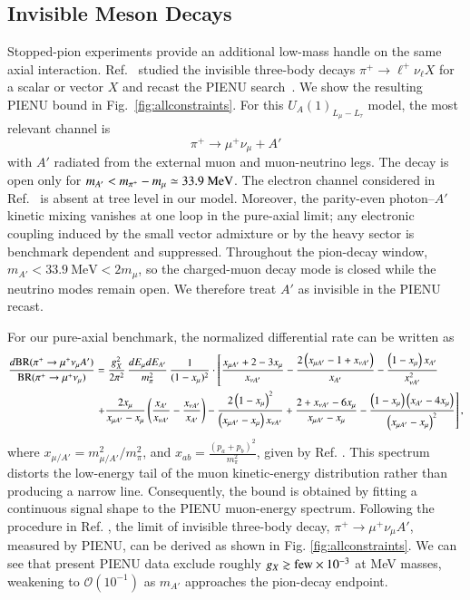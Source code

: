 \documentclass[onecolumn, aps, nofootinbib, prd, preprint, floats, floatfix, amsmath, amssymb, superscriptaddress, preprintnumbers]{revtex4-2}
\begin{document}
\subsection{Invisible Meson Decays}
\label{subsec:pion-invisible}

Stopped-pion experiments provide an additional low-mass handle on the same axial interaction. Ref.~\cite{Altmannshofer:2026opc} studied the invisible three-body decays $\pi^+\to \ell^+\nu_\ell X$ for a scalar or vector $X$ and recast the PIENU search~\cite{PIENU:2021clt}. We show the resulting PIENU bound in Fig.~\ref{fig:allconstraints}. For this $U_A(1)_{L_\mu-L_\tau}$ model, the most relevant channel is
\begin{equation}
    \pi^+\to \mu^+ \nu_\mu +A'
\end{equation}
with $A'$ radiated from the external muon and muon-neutrino legs. The decay is open only for $m_{A'}<m_{\pi^+}-m_\mu\simeq33.9~{\rm MeV}$. The electron channel considered in Ref.~\cite{Altmannshofer:2026opc} is absent at tree level in our model. Moreover, the parity-even photon--$A'$ kinetic mixing vanishes at one loop in the pure-axial limit; any electronic coupling induced by the small vector admixture or by the heavy sector is benchmark dependent and suppressed. Throughout the pion-decay window, $m_{A'}<33.9~\mathrm{MeV}<2m_\mu$, so the charged-muon decay mode is closed while the neutrino modes remain open. We therefore treat $A'$ as invisible in the PIENU recast.


For our pure-axial benchmark, the normalized differential rate can be written as \cite{Altmannshofer:2026opc}
\begin{equation}\label{eq:pion-axial-spectrum}
\small
\begin{aligned}
\frac{d{\rm BR}(\pi^+\to\mu^+\nu_\mu A')}
{{\rm BR}(\pi^+\to\mu^+\nu_\mu)}
&=\frac{g_X^2}{2\pi^2}\,
\frac{dE_\mu dE_{A'}}{m_\pi^2}\,
\frac{1}{(1-x_\mu)^2}\cdot \left[\frac{x_{\mu A'}+2-3 x_{\mu}}{x_{\nu A'}}-\frac{2\left(x_{\mu A'}-1+x_{\nu A'}\right)}{x_{A'}}-\frac{\left(1-x_{\mu}\right) x_{A'}}{x_{\nu A'}^2}\right.\\
& \left. +\frac{2 x_{\mu}}{x_{\mu A'}-x_{\mu}}\left(\frac{x_{A'}}{x_{\nu A'}}-\frac{x_{\nu A'}}{x_{A'}}\right) -\frac{2\left(1-x_{\mu}\right)^2}{\left(x_{\mu A'}-x_{\mu}\right) x_{\nu A'}}+\frac{2+x_{\nu A'}-6 x_{\mu}}{x_{\mu A'}-x_{\mu}}-\frac{\left(1-x_{\mu}\right)\left(x_{A'}-4 x_{\mu}\right)}{\left(x_{\mu A'}-x_{\mu}\right)^2}\right],
\end{aligned}
\end{equation}
where $x_{\mu/A'}=m_{\mu/A'}^2/m_\pi^2$, and $x_{a b}=\frac{(p_a+p_b)^2}{m_\pi^2}$, given by Ref. \cite{Altmannshofer:2026opc}. This spectrum distorts the low-energy tail of the muon kinetic-energy distribution rather than producing a narrow line. Consequently, the bound is obtained by fitting a continuous signal shape to the PIENU muon-energy spectrum. Following the procedure in Ref. \cite{Altmannshofer:2026opc}, the limit of invisible three-body decay, $\pi^+\to\mu^+\nu_\mu A'$, measured by PIENU, can be derived as shown in Fig. \ref{fig:allconstraints}.
We can see that present PIENU data exclude roughly $g_X\gtrsim{\rm few}\times10^{-3}$ at MeV masses, weakening to $\mathcal O(10^{-1})$ as $m_{A'}$ approaches the pion-decay endpoint.
\end{document}
